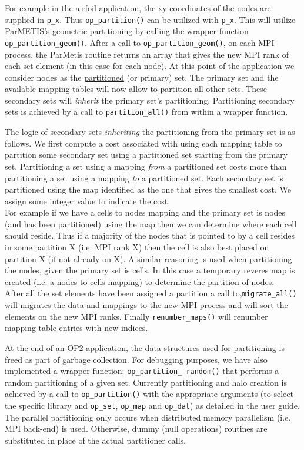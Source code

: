 \documentclass[11pt]{article}
\begin{document}
\indent For example in the airfoil application, the xy coordinates of the nodes are supplied in \texttt{p\_x}. Thus
\texttt{op\_partition()} can be utilized with \texttt{p\_x}. This will utilize ParMETIS's geometric partitioning by
calling the wrapper function \texttt{op\_partition\_geom()}. After a call to \texttt{op\_partition\_geom()}, on
each MPI process, the ParMetis routine returns an array that gives the new MPI rank of each set element (in this case
for each node). At this point of the application we consider nodes as the \underline{partitioned} (or primary) set. The
primary set and the available mapping tables will now allow to partition all other sets. These secondary sets will
\textit{inherit} the primary set's partitioning. Partitioning secondary sets is achieved by a call to
\texttt{partition\_all()} from within a wrapper function.

The logic of secondary sets \textit{inheriting} the partitioning from the primary set is as follows. We first compute a
cost associated with using each mapping table to partition some secondary set using a partitioned set starting from
the primary set. Partitioning a set using a mapping \textit{from} a partitioned set costs more than partitioning a set
using a mapping \textit{to} a partitioned set. Each secondary set is partitioned using the map identified as the one
that gives the smallest cost. We assign some integer value to indicate the cost.\\

For example if we have a cells to nodes mapping and the primary set is nodes (and has been partitioned) using the
map then we can determine where each cell should reside. Thus if a majority of the nodes that is pointed to by a cell
resides in some partition X (i.e. MPI rank X) then the cell is also best placed on partition X (if not already on X). A
similar reasoning is used when partitioning the nodes, given the primary set is cells. In this case a temporary reveres
map is created (i.e. a nodes to cells mapping) to determine the partition of nodes. \\
After all the set elements have been assigned a partition a call to,\texttt{migrate\_all()} will migrates the data and
mappings to the new MPI process and will sort the elements on the new MPI ranks. Finally \texttt{renumber\_maps()} will
renumber mapping table entries with new indices.

\indent At the end of an OP2 application, the data structures used for partitioning is freed as part of garbage
collection. For debugging purposes, we have also implemented a wrapper function: \texttt{op\_partition\_ random()} that
performs a random partitioning of a given set. Currently partitioning and halo creation is achieved by a call to
\texttt{op\_partition()} with the appropriate arguments (to select the specific library and \texttt{op\_set},
\texttt{op\_map} and \texttt{op\_dat}) as detailed in the user guide. The parallel partitioning only occurs when
distributed memory parallelism (i.e. MPI back-end) is used. Otherwise, dummy (null operations) routines are substituted
in place of the actual partitioner calls.
\end{document}
